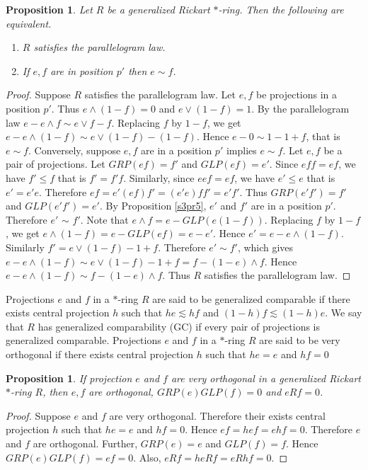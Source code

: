 \documentclass[11pt, one side,emlines]{amsart}
\newtheorem{proposition}[lemma]{Proposition}
\theoremstyle{definition}
\numberwithin{equation}{section} \thispagestyle{empty} \voffset
\begin{document}
     \begin{proposition} Let $R$ be a generalized Rickart $*$-ring. Then the following are equivalent.
     	\begin{enumerate}
     \item $R$ satisfies the parallelogram law. 
     \item If $e, f$ are in position $p'$ then $e \sim f$.
    \end{enumerate}
     \end{proposition}
     \begin{proof} Suppose $R$ satisfies the parallelogram law.
     	Let $e, f$ be projections in a position $p'$.
     	Thus $ e \wedge (1-f) = 0$ and $e \vee (1-f) = 1$.
     	By the parallelogram law $e-e\wedge f \sim e\vee f-f$.
     	Replacing $f$ by $1-f$, we get $e - e\wedge(1-f) \sim e\vee(1-f) - (1-f)$.
     	Hence $e-0 \sim 1-1+f$, that is $e\sim f$.
     	Conversely, suppose $e,f$ are in a position $p'$ implies $e \sim f$.
     	Let $e,f$ be a pair of projections.
       Let $GRP(ef) = f'$ and $GLP(ef) = e'$.
     Since $ef f = ef$, we have $f' \le f$ that is $f'=f'f$.
     Similarly, since $e ef = ef$, we have $e' \le e$ that is $e'=e'e$.
      Therefore $ef=e'(ef)f'=(e'e)ff'=e'f'$.
     	Thus $ GRP(e'f') = f'$  and $GLP(e'f') = e'$.
     By Proposition \ref{s3pr5}, $e'$ and $f'$ are in a position $p'$. 
     Therefore $e'$ $\sim$ $f'$.
     Note that $e\wedge f = e-GLP(e(1-f))$.
     	Replacing $f$ by $1-f$, we get $ e\wedge(1-f)= e - GLP(ef) = e - e'$.
     	Hence $e' = e-e\wedge(1-f)$. Similarly  $f' = e\vee(1-f)-1+f$. 
     Therefore	$e' \sim f'$, which gives $e-e\wedge(1-f) \sim e \vee  (1-f)-1+f = f-(1-e)\wedge f$.
     Hence $ e-e\wedge(1-f)\sim f-(1-e)\wedge f$.
     Thus $ R $ satisfies the parallelogram law.
     \end{proof}
   Projections $e$ and $f$ in a $*$-ring $R$ are said to be generalized comparable if there exists central projection $h$ such that $he\lesssim hf$ and    $(1-h)f\lesssim (1-h)e$.
    We say that $R$ has generalized comparability (GC) if every pair of  projections is generalized comparable.    
   Projections $e$ and $f$ in a $*$-ring $R$ are said to be very orthogonal if there exists central projection $h$ such that $he=e$ and $hf=0$
      
     \begin{proposition} If projection $e$ and $f$ are very orthogonal in a generalized  Rickart $*$-ring $R$, then
     	$e,f$ are orthogonal, $GRP(e) GLP(f)=0$ and $eRf=0$.     	
     \end{proposition}
     \begin{proof} Suppose $e$ and $f$ are very orthogonal.
     	Therefore their exists central projection $h$ such that $he =e$  and  $hf= 0$.
     	Hence $ ef = hef = ehf = 0$. Therefore $e$ and $f$ are orthogonal.
     	Further, $GRP(e)= e$ and $GLP(f)= f$. Hence $GRP(e)GLP(f)= ef = 0$.
     	Also, $eRf = heRf = eRhf = 0$.
      \end{proof}	
     	
\end{document}
